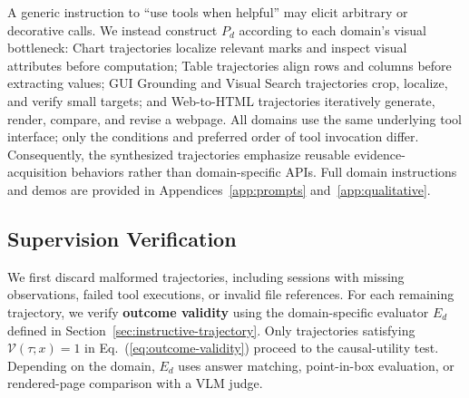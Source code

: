 
A generic instruction to ``use tools when helpful'' may elicit arbitrary or decorative calls. 
We instead construct $P_d$ according to each domain's visual bottleneck: Chart trajectories localize relevant marks and inspect visual attributes before computation; Table trajectories align rows and columns before extracting values; GUI Grounding and Visual Search trajectories crop, localize, and verify small targets; and Web-to-HTML trajectories iteratively generate, render, compare, and revise a webpage.
All domains use the same underlying tool interface; only the conditions and preferred order of tool invocation differ.
Consequently, the synthesized trajectories emphasize reusable evidence-acquisition behaviors rather than domain-specific APIs. 
Full domain instructions and demos are provided in Appendices~\ref{app:prompts} and~\ref{app:qualitative}.



\subsection{Supervision Verification}
\label{sec:filtering}

We first discard malformed trajectories, including sessions with missing observations, failed tool executions, or invalid file references. 
For each remaining trajectory, we verify \textbf{outcome validity} using the domain-specific evaluator $E_d$ defined in Section~\ref{sec:instructive-trajectory}.
Only trajectories satisfying $\mathcal{V}(\tau;x)=1$ in Eq.~(\ref{eq:outcome-validity}) proceed to the causal-utility test.
Depending on the domain, $E_d$ uses answer matching, point-in-box evaluation, or rendered-page comparison with a
VLM judge.




